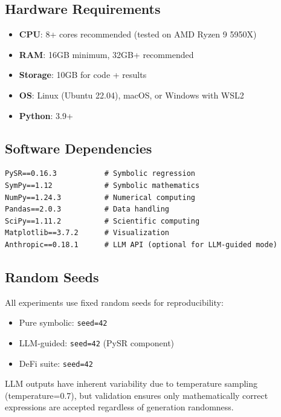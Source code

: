 \subsection{Hardware Requirements}

\begin{itemize}
\item \textbf{CPU}: 8+ cores recommended (tested on AMD Ryzen 9 5950X)
\item \textbf{RAM}: 16GB minimum, 32GB+ recommended
\item \textbf{Storage}: 10GB for code + results
\item \textbf{OS}: Linux (Ubuntu 22.04), macOS, or Windows with WSL2
\item \textbf{Python}: 3.9+
\end{itemize}

\subsection{Software Dependencies}

\begin{small}
\begin{verbatim}
PySR==0.16.3           # Symbolic regression
SymPy==1.12            # Symbolic mathematics
NumPy==1.24.3          # Numerical computing
Pandas==2.0.3          # Data handling
SciPy==1.11.2          # Scientific computing
Matplotlib==3.7.2      # Visualization
Anthropic==0.18.1      # LLM API (optional for LLM-guided mode)
\end{verbatim}
\end{small}

\subsection{Random Seeds}

All experiments use fixed random seeds for reproducibility:

\begin{itemize}
\item Pure symbolic: \texttt{seed=42}
\item LLM-guided: \texttt{seed=42} (PySR component)
\item DeFi suite: \texttt{seed=42}
\end{itemize}

LLM outputs have inherent variability due to temperature sampling (temperature=0.7), but validation ensures only mathematically correct expressions are accepted regardless of generation randomness.

